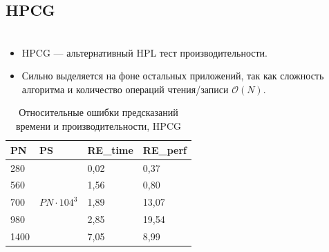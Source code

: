 \documentclass[unicode, t, 11pt]{beamer}%
\newlength{\mylen}
\begin{document}
					

	 		
		\subsection{HPCG}
			\begin{frame}
				\footnotesize
				\frametitle{\insertsection}
		 		\framesubtitle{\insertsubsection}
		 		\begin{columns}[T]
		 			\setlength{\mylen}{0.53\textwidth}
		 			\begin{column}{\mylen}
		 				\begin{itemize}[label = \(\bullet\)]
					 		\item HPCG — альтернативный HPL тест производительности.
					 		\item Сильно выделяется на фоне остальных приложений, так как сложность алгоритма и количество операций чтения/записи \(\mathcal{O}(N)\).
					 	\end{itemize}
					 	\begin{table}
				 			\captionsetup{font=tiny, labelfont=tiny}
				 			\tiny
								\begin{tabularx}{\textwidth}{|X|X|X|X|}
									\hline
								PN	& PS  & RE\_time & RE\_perf \\ \hline
								280 & \multirow{5}{*}{\(PN \cdot 104^3\)} & 0,02     & 0,37     \\ \cline{1-1} \cline{3-4}
								560 &     & 1,56     & 0,80     \\ \cline{1-1} \cline{3-4}
								700 &     & 1,89     & 13,07    \\ \cline{1-1} \cline{3-4}
								980	&     & 2,85     & 19,54    \\ \cline{1-1} \cline{3-4}
								1400 &    & 7,05     & 8,99     \\ \hline
								\end{tabularx}
							\caption{Относительные ошибки предсказаний времени и производительности, HPCG}
						\end{table}
					 			

\end{column}
\end{columns}
\end{frame}
\end{document}

